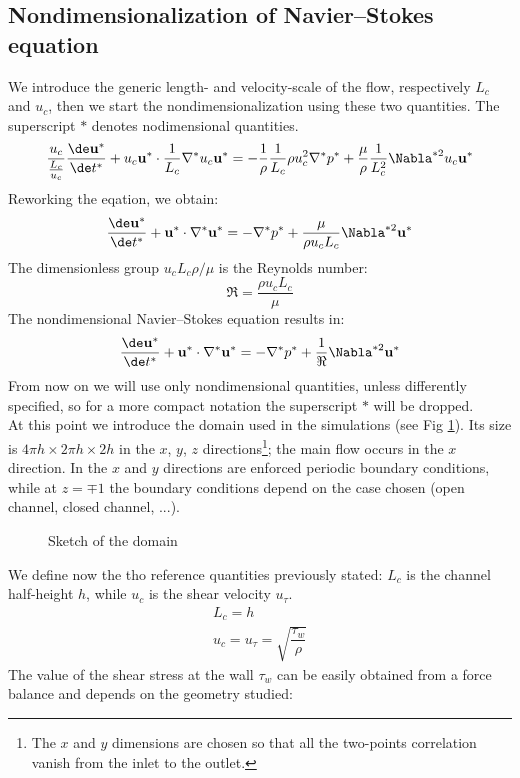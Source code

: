 \subsection{Nondimensionalization of Navier--Stokes equation}
We introduce the generic length- and velocity-scale of the flow, respectively $L_c$ and $u_c$, then we start the nondimensionalization using these two quantities. The superscript $*$ denotes nodimensional quantities.
\[
\frac{u_c}{\frac{L_c}{u_c}} \frac{\de \mathbf u^*}{\de t^*}+u_c \mathbf u^* \cdot \frac{1}{L_c}\nabla^* u_c \mathbf u^*=-\frac{1}{\rho}\frac{1}{L_c}\rho u_c^2\nabla^* p^*+\frac{\mu}{\rho}\frac{1}{L_c^2}\Nabla^{*2} u_c \mathbf u^*
\]
Reworking the eqation, we obtain:
\[
\frac{\de \mathbf u^*}{\de t^*}+\mathbf u^* \cdot \nabla^* \mathbf u^*=-\nabla^* p^*+\frac{\mu}{\rho u_cL_c}\Nabla^{*2} \mathbf u^*
\]
The dimensionless group $u_cL_c\rho/\mu$ is the Reynolds number:
\[
\Re=\frac{\rho u_c L_c}{\mu}
\]
The nondimensional Navier--Stokes equation results in:
\begin{equation}
\frac{\de \mathbf u^*}{\de t^*}+\mathbf u^* \cdot \nabla^* \mathbf u^*=-\nabla^* p^*+\frac{1}{\Re}\Nabla^{*2} \mathbf u^*
\end{equation}
From now on we will use only nondimensional quantities, unless differently specified, so for a more compact notation the superscript $*$ will be dropped.\\
At this point we introduce the domain used in the simulations (see Fig \ref{fig: domain_sketch}). Its size is $4\pi h\times2\pi h\times 2h$ in the $x$, $y$, $z$ directions\footnote{The $x$ and $y$ dimensions are chosen so that all the two-points correlation vanish from the inlet to the outlet.}; the main flow occurs in the $x$ direction. In the $x$ and $y$ directions are enforced periodic boundary conditions, while at $z=\mp1$ the boundary conditions depend on the case chosen (open channel, closed channel, ...).
\begin{figure}[H]
\centering
\def\svgwidth{0.8\textwidth}

\caption{Sketch of the domain}
\label{fig: domain_sketch}
\end{figure}
We define now the tho reference quantities previously stated: $L_c$ is the channel half-height $h$, while $u_c$ is the shear velocity $u_\tau$.
\[
\begin{array}{l}
L_c=h \\ [3px]
u_c=u_\tau=\sqrt{\dfrac{\tau_w}{\rho}}
\end{array}
\]
The value of the shear stress at the wall $\tau_w$ can be easily obtained from a force balance and depends on the geometry studied:
